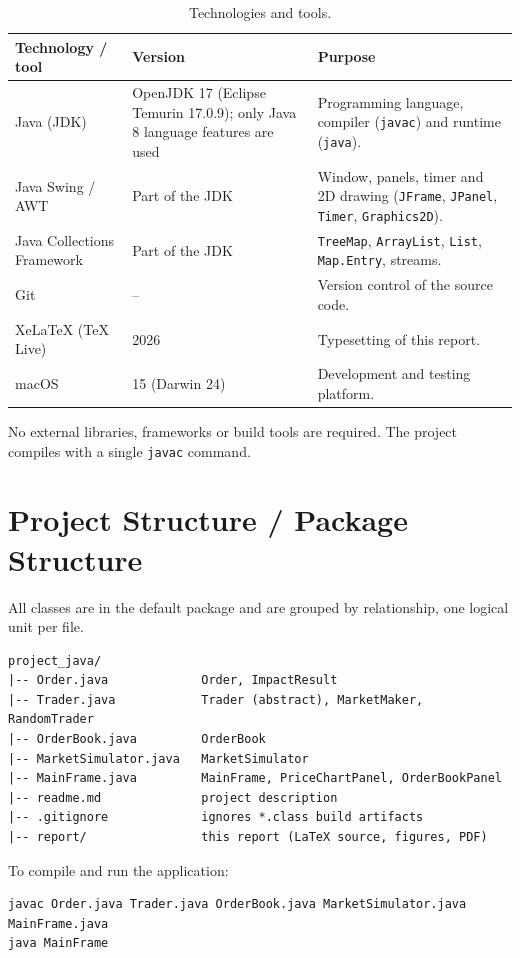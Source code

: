 \documentclass[12pt,a4paper,openany,oneside]{report}
\newcommand{\code}[1]{\texttt{#1}}
\begin{document}
\begin{table}[H]
\centering\small
\caption{Technologies and tools.}
\label{tab:tech}
\begin{tabular}{@{}L{3.6cm} L{4.2cm} L{6.9cm}@{}}
\toprule
\textbf{Technology / tool} & \textbf{Version} & \textbf{Purpose}\\
\midrule
Java (JDK) & OpenJDK 17 (Eclipse Temurin 17.0.9); only Java 8 language features are used & Programming language, compiler (\code{javac}) and runtime (\code{java}).\\
Java Swing / AWT & Part of the JDK & Window, panels, timer and 2D drawing (\code{JFrame}, \code{JPanel}, \code{Timer}, \code{Graphics2D}).\\
Java Collections Framework & Part of the JDK & \code{TreeMap}, \code{ArrayList}, \code{List}, \code{Map.Entry}, streams.\\
Git & -- & Version control of the source code.\\
XeLaTeX (TeX Live) & 2026 & Typesetting of this report.\\
macOS & 15 (Darwin 24) & Development and testing platform.\\
\bottomrule
\end{tabular}
\end{table}

No external libraries, frameworks or build tools are required. The project compiles with a single \code{javac} command.

\section{Project Structure / Package Structure}

All classes are in the default package and are grouped by relationship, one logical unit per file.

\begin{lstlisting}[style=plain]
project_java/
|-- Order.java             Order, ImpactResult
|-- Trader.java            Trader (abstract), MarketMaker, RandomTrader
|-- OrderBook.java         OrderBook
|-- MarketSimulator.java   MarketSimulator
|-- MainFrame.java         MainFrame, PriceChartPanel, OrderBookPanel
|-- readme.md              project description
|-- .gitignore             ignores *.class build artifacts
|-- report/                this report (LaTeX source, figures, PDF)
\end{lstlisting}

To compile and run the application:

\begin{lstlisting}[style=plain]
javac Order.java Trader.java OrderBook.java MarketSimulator.java MainFrame.java
java MainFrame
\end{lstlisting}
\end{document}
